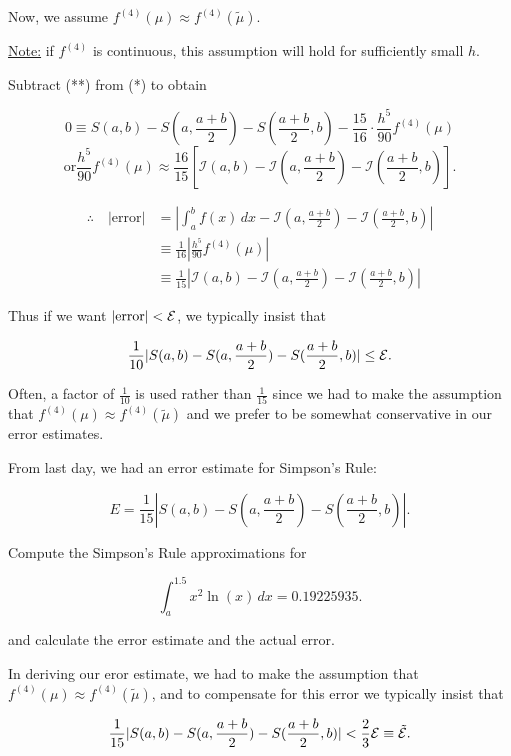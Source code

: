 Now, we assume $f^{(4)}(\mu) \approx f^{(4)}(\tilde\mu)$.

\noindent
\uline{Note:} if $f^{(4)}$ is continuous, this assumption will hold for
sufficiently small $h$.

Subtract (**) from (*) to obtain

\[
0 \equiv S(a,b) - S\left(a, \frac{a+b}{2}\right) - S\left(\frac{a+b}{2}, b\right) - \frac{15}{16} \cdot \frac{h^5}{90} f^{(4)}(\mu)
\]
\[
\text{or} \frac{h^5}{90} f^{(4)}(\mu) \approx \frac{16}{15} \left[ \mathcal{I}(a,b) - \mathcal{I}\left(a, \frac{a+b}{2}\right) - \mathcal{I}\left(\frac{a+b}{2}, b\right) \right]
.\]

\begin{align*}
\therefore \quad \left| \text{error} \right| 
&= \left| \int_a^b f(x) \, dx - \mathcal{I}\left(a, \frac{a+b}{2}\right) - \mathcal{I}\left(\frac{a+b}{2}, b\right) \right| \\
&\equiv \frac{1}{16} \left| \frac{h^5}{90} f^{(4)}(\mu) \right| \\
&\equiv \frac{1}{15} \left| \mathcal{I}(a,b) - \mathcal{I}\left(a, \frac{a+b}{2}\right) - \mathcal{I}\left(\frac{a+b}{2}, b\right) \right|
\end{align*}

Thus if we want $|\text{error}|<\mathcal{E} $, we typically insist that 

\[
\frac{1}{10} |S(a,b)-S(a,\frac{a+b}{2}) - S(\frac{a+b}{2}, b)| \leq \mathcal{E}
.\]

Often, a factor of $\frac{1}{10}$ is used rather than $\frac{1}{15}$ since we
had to make the assumption that $f^{(4)}(\mu) \approx f^{(4)}(\tilde\mu)$ and we
prefer to be somewhat conservative in our error estimates.

From last day, we had an error estimate for Simpson's Rule: 

\[
E = \frac{1}{15} |S(a,b)-S(a,\frac{a+b}{2}) - S(\frac{a+b}{2}, b)|
.\]

\Ex Compute the Simpson's Rule approximations for

\[
\int_{a}^{1.5} x^2 \ln(x) \, dx = 0.19225935
.\]

and calculate the error estimate and the actual error.

In deriving our eror estimate, we had to make the assumption that $f^{(4)}(\mu)
\approx f^{(4)}(\tilde\mu)$, and to compensate for this error we typically
insist that

\[
\frac{1}{15} |S(a,b)-S(a,\frac{a+b}{2}) - S(\frac{a+b}{2}, b)| < \frac{2}{3}
\mathcal{E} \equiv \tilde{\mathcal{E}}
.\]

